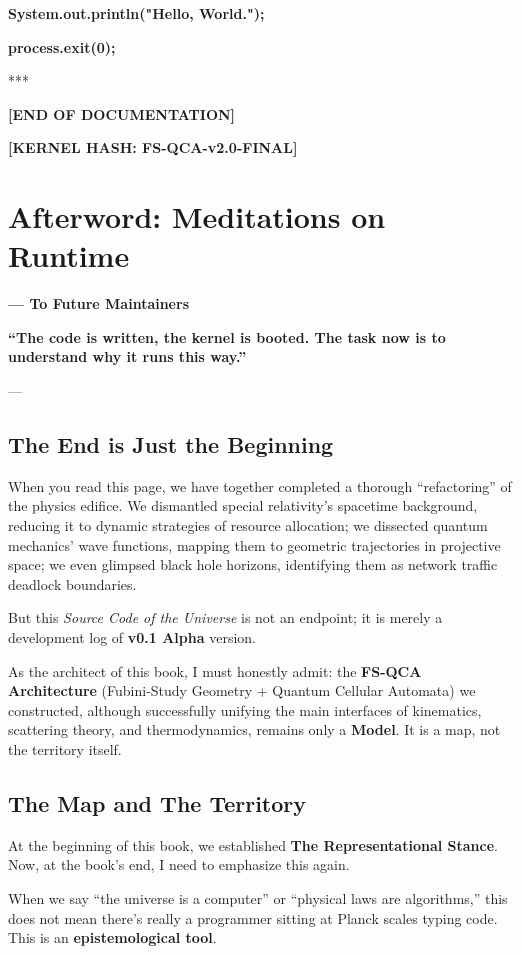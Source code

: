 \documentclass[11pt,a4paper,twoside]{book}
\begin{document}
\textbf{System.out.println("Hello, World.");}

\textbf{process.exit(0);}

***

\textbf{[END OF DOCUMENTATION]}

\textbf{[KERNEL HASH: FS-QCA-v2.0-FINAL]}

\clearpage{}

\clearpage{}\chapter*{Afterword: Meditations on Runtime}

\textbf{--- To Future Maintainers}

\textbf{``The code is written, the kernel is booted. The task now is to understand why it runs this way.''}

---

\section{The End is Just the Beginning}

When you read this page, we have together completed a thorough ``refactoring'' of the physics edifice. We dismantled special relativity's spacetime background, reducing it to dynamic strategies of resource allocation; we dissected quantum mechanics' wave functions, mapping them to geometric trajectories in projective space; we even glimpsed black hole horizons, identifying them as network traffic deadlock boundaries.

But this \textit{Source Code of the Universe} is not an endpoint; it is merely a development log of \textbf{v0.1 Alpha} version.

As the architect of this book, I must honestly admit: the \textbf{FS-QCA Architecture} (Fubini-Study Geometry + Quantum Cellular Automata) we constructed, although successfully unifying the main interfaces of kinematics, scattering theory, and thermodynamics, remains only a \textbf{Model}. It is a map, not the territory itself.

\section{The Map and The Territory}

At the beginning of this book, we established \textbf{The Representational Stance}. Now, at the book's end, I need to emphasize this again.

When we say ``the universe is a computer'' or ``physical laws are algorithms,'' this does not mean there's really a programmer sitting at Planck scales typing code. This is an \textbf{epistemological tool}.
\end{document}
